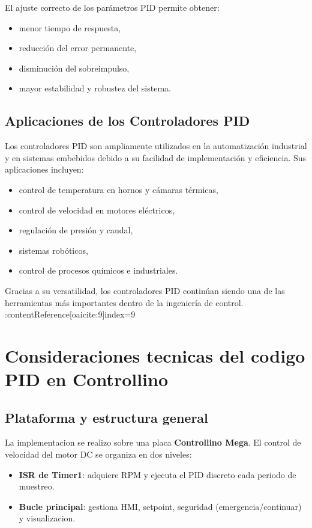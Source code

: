 \documentclass[journal, onecolumn]{IEEEtran}
\begin{document}
El ajuste correcto de los parámetros PID permite obtener:

\begin{itemize}
    \item menor tiempo de respuesta,
    \item reducción del error permanente,
    \item disminución del sobreimpulso,
    \item mayor estabilidad y robustez del sistema.
\end{itemize}

\subsection{Aplicaciones de los Controladores PID}

Los controladores PID son ampliamente utilizados en la automatización industrial y en sistemas embebidos debido a su facilidad de implementación y eficiencia. Sus aplicaciones incluyen:

\begin{itemize}
    \item control de temperatura en hornos y cámaras térmicas,
    \item control de velocidad en motores eléctricos,
    \item regulación de presión y caudal,
    \item sistemas robóticos,
    \item control de procesos químicos e industriales.
\end{itemize}

Gracias a su versatilidad, los controladores PID continúan siendo una de las herramientas más importantes dentro de la ingeniería de control. :contentReference[oaicite:9]{index=9}





\section{Consideraciones tecnicas del codigo PID en Controllino}

\subsection{Plataforma y estructura general}
La implementacion se realizo sobre una placa \textbf{Controllino Mega}.
El control de velocidad del motor DC se organiza en dos niveles:
\begin{itemize}
  \item \textbf{ISR de Timer1}: adquiere RPM y ejecuta el PID discreto cada periodo de muestreo.
  \item \textbf{Bucle principal}: gestiona HMI, setpoint, seguridad (emergencia/continuar) y visualizacion.
\end{itemize}
\end{document}
